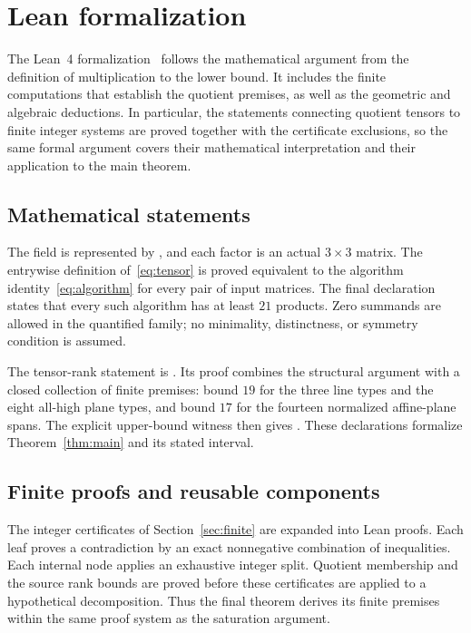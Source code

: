 \section{Lean formalization}\label{sec:formalization}

The Lean~4 formalization~\cite{lean4} follows the mathematical argument from the definition
of multiplication to the lower bound. It includes the finite
computations that establish the quotient premises, as well as the
geometric and algebraic deductions. In particular, the statements connecting quotient tensors to finite
integer systems are proved together with the certificate exclusions,
so the same formal argument covers their mathematical interpretation
and their application to the main theorem.

\subsection{Mathematical statements}
The field is represented by , and each factor is an
actual $3\times3$ matrix. The entrywise definition
of~\eqref{eq:tensor} is proved equivalent to the algorithm
identity~\eqref{eq:algorithm} for every pair of input matrices.
The final declaration  states that
every such algorithm has at least $21$ products. Zero summands are
allowed in the quantified family; no minimality, distinctness, or
symmetry condition is assumed.

The tensor-rank statement is .
Its proof combines the structural argument with a closed collection of
finite premises: bound $19$ for the three line types and the eight
all-high plane types, and bound $17$ for the fourteen normalized
affine-plane spans. The explicit upper-bound witness then gives
. These declarations formalize
Theorem~\ref{thm:main} and its stated interval.

\subsection{Finite proofs and reusable components}
The integer certificates of Section~\ref{sec:finite} are expanded
into Lean proofs. Each leaf proves a contradiction by an exact
nonnegative combination of inequalities. Each internal node applies an
exhaustive integer split. Quotient membership and the source rank
bounds are proved before these certificates are applied to a
hypothetical decomposition. Thus the final theorem derives its finite
premises within the same proof system as the saturation argument.

